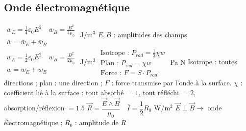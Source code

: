 \subsection{Onde électromagnétique}
\begin{formules}
    {$\begin{gathered}
      \bar w_E = \frac{1}{4}\varepsilon_0E^2 \quad \bar w_B = \frac{B^2}{4\mu_0} \\
      \bar w = \bar w_E + \bar w_B
     \end{gathered}$}
    {J/m$^3$}
    {$E, B$ : amplitudes des champs}
    {$\begin{gathered}
      w_E = \frac{1}{2}\varepsilon_0E^2 \quad w_B = \frac{B^2}{2\mu_0} \\
      w = w_E + w_B
     \end{gathered}$}
    {J/m$^3$}
    {}
    {$\begin{gathered}
      \text{Isotrope : } P_{rad} = \tfrac{1}{3}\chi w \\
      \text{Plan : } P_{rad} = \chi w \\
      \text{Force : } F = S\cdot P_{rad}
     \end{gathered}$}
    {Pa \newline\newline N}
    {Isotrope : toutes directions ; plan : une direction ; $F$ : force transmise par l'onde à la surface.
     $\chi$ : coefficient lié à la surface : tout absorbé $= 1$, tout réfléchi $= 2$, absorption/réflexion $= 1.5$}
    {$\vec R = \dfrac{\vec E\wedge\vec B}{\mu_0} \quad \bar I = \dfrac{1}{2}R_0$}
    {W/m$^2$}
    {$\vec E\perp\vec B \to$ onde électromagnétique ; $R_0$ : amplitude de $R$}
\end{formules}
